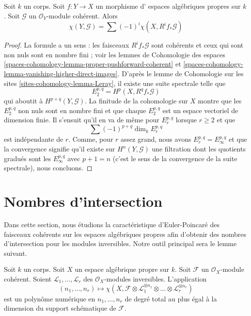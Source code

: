 \begin{lemma}
\label{lemma-euler-characteristic-morphism}
Soit $k$ un corps. Soit $f : Y \to X$ un morphisme d'
espaces algébriques propres sur $k$. Soit $\mathcal{G}$ un
$\mathcal{O}_Y$-module cohérent. Alors
$$
\chi(Y, \mathcal{G}) = \sum (-1)^i \chi(X, R^if_*\mathcal{G})
$$
\end{lemma}

\begin{proof}
La formule a un sens : les faisceaux $R^if_*\mathcal{G}$ sont cohérents
et ceux qui sont non nuls sont en nombre fini ; voir les
lemmes de Cohomologie des espaces
\ref{spaces-cohomology-lemma-proper-pushforward-coherent} et
\ref{spaces-cohomology-lemma-vanishing-higher-direct-images}.
D'après le lemme de Cohomologie sur les sites \ref{sites-cohomology-lemma-Leray},
il existe une suite spectrale telle que
$$
E_2^{p, q} = H^p(X, R^qf_*\mathcal{G})
$$
qui aboutit à $H^{p + q}(Y, \mathcal{G})$. La finitude de la cohomologie
sur $X$ montre que les $E_2^{p, q}$ non nuls sont en nombre fini
et que chaque $E_2^{p, q}$ est un espace vectoriel de dimension finie. Il s'ensuit
qu'il en va de même pour $E_r^{p, q}$ lorsque $r \geq 2$ et que
$$
\sum (-1)^{p + q} \dim_k E_r^{p, q}
$$
est indépendante de $r$. Comme, pour $r$ assez grand, nous avons
$E_r^{p, q} = E_\infty^{p, q}$ et que la convergence signifie qu'il
existe sur $H^n(Y, \mathcal{G})$ une filtration dont les quotients gradués sont
les $E_\infty^{p, q}$ avec $p + 1 = n$ (c'est le sens de la convergence
de la suite spectrale), nous concluons.
\end{proof}








\section{Nombres d'intersection}
\label{section-num}

\noindent
Dans cette section, nous étudions la caractéristique d'Euler-Poincaré des
faisceaux cohérents sur les espaces algébriques propres afin d'obtenir des
nombres d'intersection pour les modules inversibles. Notre outil principal sera le
lemme suivant.

\begin{lemma}
\label{lemma-numerical-polynomial-from-euler}
Soit $k$ un corps. Soit $X$ un espace algébrique propre sur $k$.
Soit $\mathcal{F}$ un $\mathcal{O}_X$-module cohérent. Soient
$\mathcal{L}_1, \ldots, \mathcal{L}_r$ des $\mathcal{O}_X$-modules inversibles.
L'application
$$
(n_1, \ldots, n_r) \longmapsto
\chi(X, \mathcal{F} \otimes
\mathcal{L}_1^{\otimes n_1} \otimes \ldots \otimes
\mathcal{L}_r^{\otimes n_r})
$$
est un polynôme numérique en $n_1, \ldots, n_r$ de degré total au
plus égal à la dimension du support schématique de $\mathcal{F}$.
\end{lemma}

